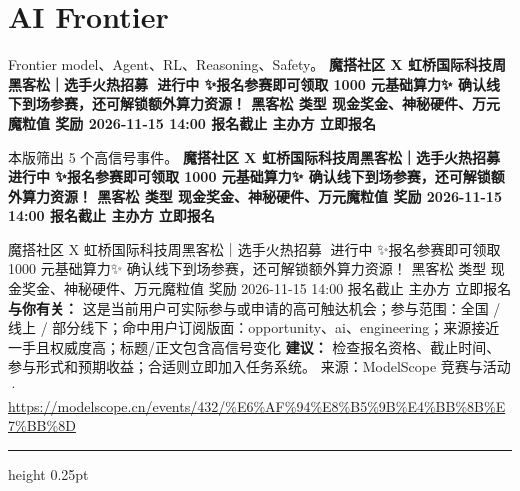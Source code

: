 \documentclass[10.5pt]{ctexart}
\begin{document}
\section*{AI Frontier}
{\color{ormuted} Frontier model、Agent、RL、Reasoning、Safety。}
\vspace{2mm}
{\LARGE\bfseries 魔搭社区 X 虹桥国际科技周黑客松｜选手火热招募🚀 进行中 ✨报名参赛即可领取 1000 元基础算力✨ 确认线下到场参赛，还可解锁额外算力资源！ 黑客松 类型 现金奖金、神秘硬件、万元魔粒值 奖励 2026-11-15 14:00 报名截止 主办方 立即报名}\par
\vspace{1mm}
{\color{ormuted} 本版筛出 5 个高信号事件。}
\vspace{3mm}
{\Large\bfseries 魔搭社区 X 虹桥国际科技周黑客松｜选手火热招募🚀 进行中 ✨报名参赛即可领取 1000 元基础算力✨ 确认线下到场参赛，还可解锁额外算力资源！ 黑客松 类型 现金奖金、神秘硬件、万元魔粒值 奖励 2026-11-15 14:00 报名截止 主办方 立即报名}\par
魔搭社区 X 虹桥国际科技周黑客松｜选手火热招募🚀 进行中 ✨报名参赛即可领取 1000 元基础算力✨ 确认线下到场参赛，还可解锁额外算力资源！ 黑客松 类型 现金奖金、神秘硬件、万元魔粒值 奖励 2026-11-15 14:00 报名截止 主办方 立即报名
\textbf{与你有关：} 这是当前用户可实际参与或申请的高可触达机会；参与范围：全国 / 线上 / 部分线下；命中用户订阅版面：opportunity、ai、engineering；来源接近一手且权威度高；标题/正文包含高信号变化
\textbf{建议：} 检查报名资格、截止时间、参与形式和预期收益；合适则立即加入任务系统。
{\footnotesize\color{ormuted} 来源：ModelScope 竞赛与活动 · \url{https://modelscope.cn/events/432/%E6%AF%94%E8%B5%9B%E4%BB%8B%E7%BB%8D}}
\vspace{4mm}
\hrule height 0.25pt
\vspace{3mm}
\end{document}
